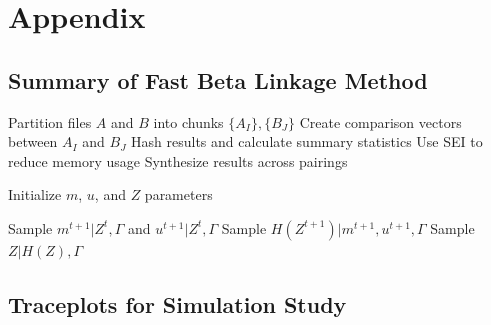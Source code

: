 \documentclass[12pt,letterpaper]{article}
\newcommand{\1}[1]{\mathbb{I}\!\left[#1\right]} %
\begin{document}
\clearpage

\section{Appendix}
\label{sec:appendix}

\hypertarget{app:fabl-psuedocode}{%
	\subsection{Summary of Fast Beta Linkage Method}\label{app:fabl-psuedocode}}

\begin{algorithm}[h!]
	\begin{algorithmic}[1]
		
		\State Partition files $A$ and $B$ into chunks $\{A_I\}, \{B_J\}$
		\State Create comparison vectors between $A_I$ and $B_J$
		\State Hash results and calculate summary statistics
		\State Use SEI to reduce memory usage
		\EndFor
		\State Synthesize results across pairings
		\EndProcedure
		
		\State Initialize $m$, $u$, and $Z$ parameters
		
		\State Sample $m^{t+1}|Z^{t}, \Gamma$ and  $u^{t+1}|Z^{t}, \Gamma$ 
		\State Sample $H\left(Z^{t+1}\right)|m^{t+1}, u^{t+1}, \Gamma$  
		\EndFor
		\State Sample $Z | H(Z), \Gamma$ 
		
		\EndProcedure
		
	\end{algorithmic}
\end{algorithm}

\hypertarget{appendix-sim}{%
	\subsection{Traceplots for Simulation Study}\label{app:appendix-sim}}
\end{document}
